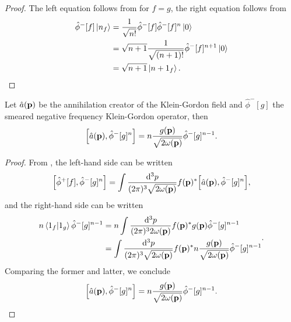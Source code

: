 \qkgsmearedpn
\begin{proof}
	The left equation follows from  for $f=g$, the right equation follows from
	\begin{equation*}
		\begin{split}
			\hat\phi^-[f]
			\ket{n_f}
			&=
			\frac{1}{\sqrt{n!}}
			\hat\phi^-[f]
			\hat\phi^-[f]^n
			\ket{0}
			\\
			&=
			\sqrt{n+1}
			\frac{1}{\sqrt{(n+1)!}}
			\hat\phi^-[f]^{n+1}
			\ket{0}
			\\
			&=
			\sqrt{n+1}
			\ket{n+1_f}
			.
		\end{split}
	\end{equation*}
\end{proof}

\begin{lemma}\label{thm:qkg_comm_annihilation_smeared_pos_kg}
	Let $\hat{a}(\vb{p})$ be the annihilation creator of the Klein-Gordon field and $\hat\phi^-[g]$ the smeared negative frequency Klein-Gordon operator, then
	\begin{equation}\label{eq:qkg_comm_annihilation_smeared_pos_kg}
		\comm{\hat{a}(\vb{p})}{\hat\phi^-[g]^n}		
		=
		n
		\frac{g(\vb{p})}{\sqrt{2\omega(\vb{p})}}
		\hat\phi^-[g]^{n-1}
		.
	\end{equation}
\end{lemma}
\begin{proof}
	From , the left-hand side can be written
	\begin{equation*}
		\comm{\hat\phi^+[f]}{\hat\phi^-[g]^n}
		=
		\int\frac{\dd[3]{p}}{(2\pi)^3\sqrt{2\omega(\vb{p})}}
		f(\vb{p})^*
		\comm{\hat{a}(\vb{p})}{\hat\phi^-[g]^n}
		,
	\end{equation*}
	and the right-hand side can be written
	\begin{equation*}
		\begin{split}
			n
			\braket{1_f}{1_g}
			\hat\phi^-[g]^{n-1}
			&=
			n
			\int\frac{\dd[3]{p}}{(2\pi)^32\omega(\vb{p})}
			f(\vb{p})^*
			g(\vb{p})
			\hat\phi^-[g]^{n-1}
			\\
			&=
			\int\frac{\dd[3]{p}}{(2\pi)^3\sqrt{2\omega(\vb{p})}}
			f(\vb{p})^*
			n
			\frac{g(\vb{p})}{\sqrt{2\omega(\vb{p})}}
			\hat\phi^-[g]^{n-1}
		\end{split}
		.
	\end{equation*}
	Comparing the former and latter, we conclude
	\begin{equation*}
		\comm{\hat{a}(\vb{p})}{\hat\phi^-[g]^n}		
		=
		n
		\frac{g(\vb{p})}{\sqrt{2\omega(\vb{p})}}
		\hat\phi^-[g]^{n-1}
		.
	\end{equation*}
\end{proof}

